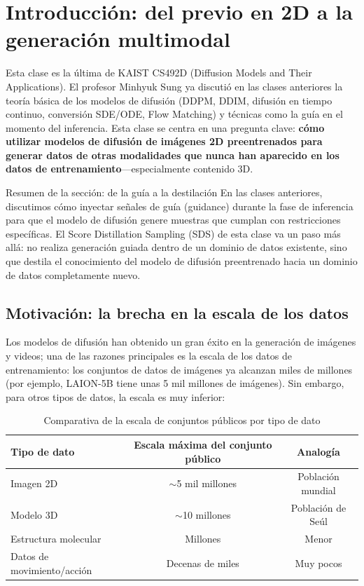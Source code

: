 \section{Introducción: del previo en 2D a la generación multimodal}

Esta clase es la última de KAIST CS492D (Diffusion Models and Their Applications). El profesor Minhyuk Sung ya discutió en las clases anteriores la teoría básica de los modelos de difusión (DDPM, DDIM, difusión en tiempo continuo, conversión SDE/ODE, Flow Matching) y técnicas como la guía en el momento del inferencia. Esta clase se centra en una pregunta clave: \textbf{cómo utilizar modelos de difusión de imágenes 2D preentrenados para generar datos de otras modalidades que nunca han aparecido en los datos de entrenamiento}—especialmente contenido 3D.

\begin{knowledgebox}{Resumen de la sección: de la guía a la destilación}
En las clases anteriores, discutimos cómo inyectar señales de guía (guidance) durante la fase de inferencia para que el modelo de difusión genere muestras que cumplan con restricciones específicas. El Score Distillation Sampling (SDS) de esta clase va un paso más allá: no realiza generación guiada dentro de un dominio de datos existente, sino que destila el conocimiento del modelo de difusión preentrenado hacia un dominio de datos completamente nuevo.
\end{knowledgebox}

\subsection{Motivación: la brecha en la escala de los datos}

Los modelos de difusión han obtenido un gran éxito en la generación de imágenes y videos; una de las razones principales es la escala de los datos de entrenamiento: los conjuntos de datos de imágenes ya alcanzan miles de millones (por ejemplo, LAION-5B tiene unas 5 mil millones de imágenes). Sin embargo, para otros tipos de datos, la escala es muy inferior:

\begin{table}[H]
\centering
\begin{tabular}{lcc}
\toprule
\textbf{Tipo de dato} & \textbf{Escala máxima del conjunto público} & \textbf{Analogía} \\
\midrule
Imagen 2D & $\sim$5 mil millones & Población mundial \\
Modelo 3D & $\sim$10 millones & Población de Seúl \\
Estructura molecular & Millones & Menor \\
Datos de movimiento/acción & Decenas de miles & Muy pocos \\
\bottomrule
\end{tabular}
\caption{Comparativa de la escala de conjuntos públicos por tipo de dato}
\end{table}


